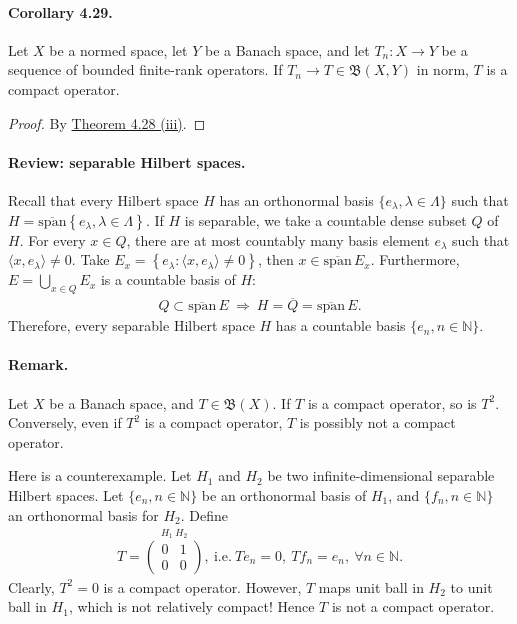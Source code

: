 \documentclass{article}
\begin{document}
\paragraph{Corollary 4.29.\label{cor:4.29}} Let $X$ be a normed space, let $Y$ be a Banach space, and let $T_n:X\to Y$ be a sequence of bounded finite-rank operators. If $T_n\to T\in\mathfrak{B}(X,Y)$ in norm, $T$ is a compact operator.
\begin{proof}
By \hyperref[thm:4.28]{Theorem 4.28 (iii)}.
\end{proof}

\paragraph{Review: separable Hilbert spaces.} Recall that every Hilbert space $H$ has an orthonormal basis $\{e_\lambda,\lambda\in\Lambda\}$ such that $H=\overline{\mathrm{span}}\left\{e_\lambda,\lambda\in\Lambda\right\}$. If $H$ is separable, we take a countable dense subset $Q$ of $H$. For every $x\in Q$, there are at most countably many basis element $e_\lambda$ such that $\langle x,e_\lambda\rangle\neq 0$. Take $E_x = \left\{e_\lambda:\langle x,e_\lambda\rangle\neq 0\right\}$, then $x\in\overline{\mathrm{span}}\,E_x$. Furthermore, $E=\bigcup_{x\in Q} E_x$ is a countable basis of $H$:
\begin{align*}
	Q\subset\overline{\mathrm{span}}\,E\ \Rightarrow\ H=\overline{Q} = \overline{\mathrm{span}}\,E.
\end{align*}
Therefore, every separable Hilbert space $H$ has a countable basis $\{e_n,n\in\mathbb{N}\}$.

\paragraph{Remark.} Let $X$ be a Banach space, and $T\in\mathfrak{B}(X)$. If $T$ is a compact operator, so is $T^2$. Conversely, even if $T^2$ is a compact operator, $T$ is possibly not a compact operator.

Here is a counterexample. Let $H_1$ and $H_2$ be two infinite-dimensional separable Hilbert spaces. Let $\{e_n,n\in\mathbb{N}\}$ be an orthonormal basis of $H_1$, and $\{f_n,n\in\mathbb{N}\}$ an orthonormal basis for $H_2$. Define
\begin{align*}
	T = \overset{H_1\ H_2}{\begin{pmatrix}
			0 & 1\\ 0 & 0
	\end{pmatrix}},\ \text{i.e.}\ Te_n = 0,\ Tf_n=e_n,\ \forall n\in\mathbb{N}.
\end{align*}
Clearly, $T^2=0$ is a compact operator. However, $T$ maps unit ball in $H_2$ to unit ball in $H_1$, which is not relatively compact! Hence $T$ is not a compact operator.
\end{document}
